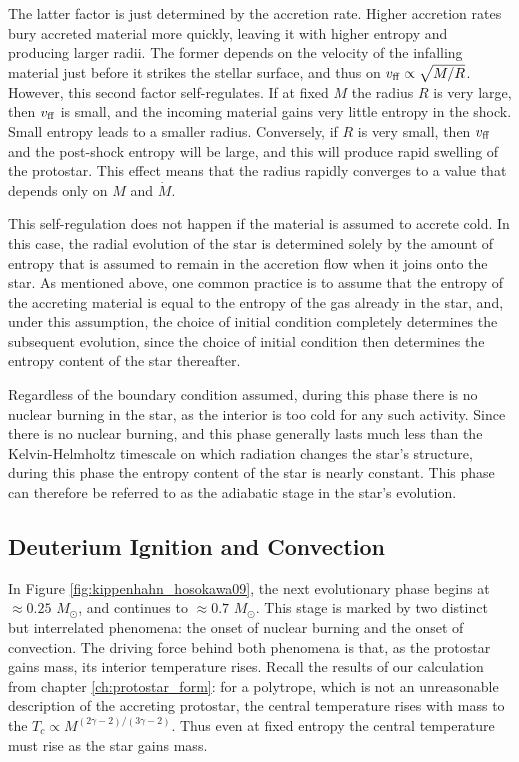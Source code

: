 The latter factor is just determined by the accretion rate. Higher accretion rates bury accreted material more quickly, leaving it with higher entropy and producing larger radii. The former depends on the velocity of the infalling material just before it strikes the stellar surface, and thus on $v_{\rm ff}\propto \sqrt{M/R}$. However, this second factor self-regulates. If at fixed $M$ the radius $R$ is very large, then $v_{\rm ff}$ is small, and the incoming material gains very little entropy in the shock. Small entropy leads to a smaller radius. Conversely, if $R$ is very small, then $v_{\rm ff}$ and the post-shock entropy will be large, and this will produce rapid swelling of the protostar. This effect means that the radius rapidly converges to a value that depends only on $M$ and $\dot{M}$.

This self-regulation does not happen if the material is assumed to accrete cold. In this case, the radial evolution of the star is determined solely by the amount of entropy that is assumed to remain in the accretion flow when it joins onto the star. As mentioned above, one common practice is to assume that the entropy of the accreting material is equal to the entropy of the gas already in the star, and, under this assumption, the choice of initial condition completely determines the subsequent evolution, since the choice of initial condition then determines the entropy content of the star thereafter.

Regardless of the boundary condition assumed, during this phase there is no nuclear burning in the star, as the interior is too cold for any such activity. Since there is no nuclear burning, and this phase generally lasts much less than the Kelvin-Helmholtz timescale on which radiation changes the star's structure, during this phase the entropy content of the star is nearly constant. This phase can therefore be referred to as the adiabatic stage in the star's evolution.


\subsection{Deuterium Ignition and Convection}

In Figure \ref{fig:kippenhahn_hosokawa09}, the next evolutionary phase begins at $\approx 0.25$ $M_\odot$, and continues to $\approx 0.7$ $M_\odot$. This stage is marked by two distinct but interrelated phenomena: the onset of nuclear burning and the onset of convection. The driving force behind both phenomena is that, as the protostar gains mass, its interior temperature rises. Recall the results of our calculation from chapter \ref{ch:protostar_form}: for a polytrope, which is not an unreasonable description of the accreting protostar, the central temperature rises with mass to the $T_c\propto M^{(2\gamma-2)/(3\gamma-2)}$. Thus even at fixed entropy the central temperature must rise as the star gains mass.


